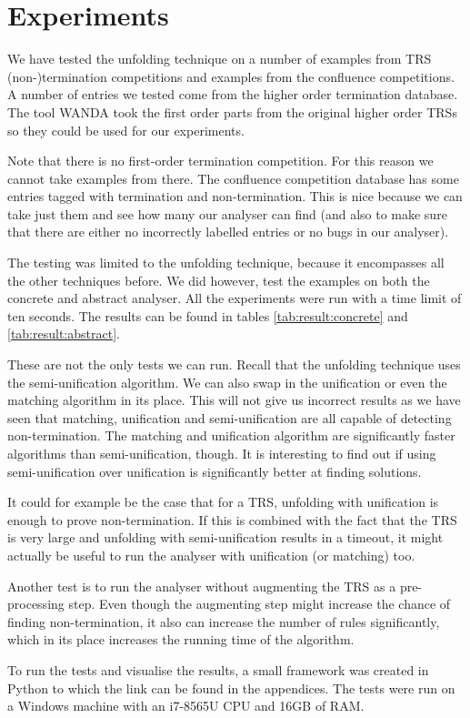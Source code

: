 \chapter{Experiments}\label{experiments}
We have tested the unfolding technique on a number of examples from TRS (non-)termination competitions\cite{TermPortal} and examples from the confluence competitions\cite{COPS}. A number of entries we tested come from the higher order termination database. The tool WANDA\cite{KOP:WANDASITE} took the first order parts from the original higher order TRSs so they could be used for our experiments. 

Note that there is no first-order termination competition. For this reason we cannot take examples from there. The confluence competition database has some entries tagged with termination and non-termination. This is nice because we can take just them and see how many our analyser can find (and also to make sure that there are either no incorrectly labelled entries or no bugs in our analyser). 

The testing was limited to the unfolding technique, because it encompasses all the other techniques before. We did however, test the examples on both the concrete and abstract analyser. All the experiments were run with a time limit of ten seconds. The results can be found in tables \ref{tab:result:concrete} and \ref{tab:result:abstract}.

These are not the only tests we can run. Recall that the unfolding technique uses the semi-unification algorithm. We can also swap in the unification or even the matching algorithm in its place. This will not give us incorrect results as we have seen that matching, unification and semi-unification are all capable of detecting non-termination. The matching and unification algorithm are significantly faster algorithms than semi-unification, though. It is interesting to find out if using semi-unification over unification is significantly better at finding solutions. 

It could for example be the case that for a TRS, unfolding with unification is enough to prove non-termination. If this is combined with the fact that the TRS is very large and unfolding with semi-unification results in a timeout, it might actually be useful to run the analyser with unification (or matching) too. 

Another test is to run the analyser without augmenting the TRS as a pre-processing step. Even though the augmenting step might increase the chance of finding non-termination, it also can increase the number of rules significantly, which in its place increases the running time of the algorithm. 

To run the tests and visualise the results, a small framework was created in Python to which the link can be found in the appendices. The tests were run on a Windows machine with an i7-8565U CPU and 16GB of RAM. 
